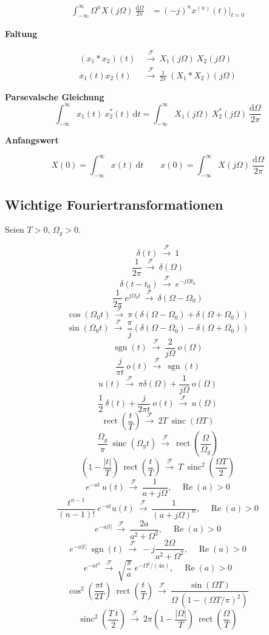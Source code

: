 \documentclass[10pt,a4paper]{article}
\newcommand{\fancyformula}[2]{
	\small
	\raggedright\sffamily\textbf{#1}
	#2
}
\newcommand{\ftransform}{
	~\xrightarrow{~\mathcal{F}~}~
}
\DeclareMathOperator{\sinc}{sinc}
\DeclareMathOperator{\sgn}{sgn}
\DeclareMathOperator{\rect}{rect}
\renewcommand{\Re}{\operatorname{Re}}
\begin{document}
\begin{multicols}{2}
{\begin{align*}
	\int_{-\infty}^{\infty}\Omega^n X(j\Omega) ~ \frac{\mathrm d\Omega}{2\pi}&=(-j)^n x^{(n)}(t) \bigg|_{t=0}
\end{align*}	
}
\fancyformula{Faltung}{
\begin{align*}
	(x_1 \ast x_2)(t) &\ftransform X_1(j\Omega) ~ X_2(j\Omega)\\
	x_1(t)x_2(t) &\ftransform \frac{1}{2\pi} ~ (X_1 \ast X_2)(j\Omega)
\end{align*}
}
\fancyformula{Parsevalsche Gleichung}{\[ \int_{-\infty}^{\infty} x_1(t) ~ x_2^*(t) ~ \mathrm dt = \int_{-\infty}^{\infty}X_1(j\Omega) ~ X_2^*(j\Omega) ~ \frac{\mathrm d\Omega}{2\pi} \]}

\fancyformula{Anfangswert}{
	\[ X(0) = \int_{-\infty}^{\infty} x(t) ~ \mathrm dt \qquad x(0)=\int_{-\infty}^{\infty} X(j\Omega) ~ \frac{\mathrm d\Omega}{2\pi} \]	
}
\end{multicols}
\newpage

\subsection*{Wichtige Fouriertransformationen}
Seien $T>0$, $\Omega_g>0$.
\begin{multicols}{2}
	\small
	\[ \delta(t) \ftransform 1 \]
	\[ \frac{1}{2 \pi} \ftransform \delta(\Omega) \]
	\[ \delta(t - t_0) \ftransform e^{-j\Omega t_0} \]
	\[ \frac{1}{2 \pi} ~ e^{j \Omega_0 t} \ftransform \delta(\Omega - \Omega_0) \]
	\[ \cos(\Omega_0 t) \ftransform \pi \left( \delta(\Omega - \Omega_0) + \delta(\Omega + \Omega_0) \right) \]
	\[ \sin(\Omega_0 t) \ftransform \frac{\pi}{j} \left( \delta(\Omega - \Omega_0) - \delta(\Omega + \Omega_0) \right) \]
	\[ \sgn(t) \ftransform \frac{2}{j \Omega} ~ o(\Omega) \]
	\[ \frac{j}{\pi t} ~ o(t) \ftransform \sgn(t) \]
	\[ u(t) \ftransform \pi \delta(\Omega) + \frac{1}{j \Omega} ~ o(\Omega) \]
	\[ \frac{1}{2} ~ \delta(t) + \frac{j}{2 \pi t} ~ o(t) \ftransform u(\Omega) \]
	\[ \rect \left(\frac{t}{T} \right) \ftransform 2 T ~ \sinc(\Omega T) \]
	\[ \frac{\Omega_g}{\pi} ~ \sinc(\Omega_g t) \ftransform \rect \left( \frac{\Omega}{\Omega_g} \right) \]
	\[ \left(1 - \frac{|t|}{T} \right) ~ \rect \left(\frac{t}{T} \right) \ftransform T ~ \sinc^2 \left( \frac{\Omega T}{2} \right) \]
	\[ e^{-at} ~ u(t) \ftransform \frac{1}{a+j\Omega},\quad \Re(a)>0 \]
	\[ \frac{t^{n-1}}{(n-1)!} ~ e^{-at}u(t) \ftransform \frac{1}{(a+j\Omega)^n},\quad \Re(a)>0 \]
	\[ e^{-a |t|} \ftransform \frac{2a}{a^2+\Omega^2},\quad \Re(a)>0\]
	\[ e^{-a |t|} ~ \sgn(t) \ftransform -j\frac{2\Omega}{a^2+\Omega^2},\quad \Re(a)>0 \]
	\[ e^{-at^2} \ftransform \sqrt{\frac{\pi}{a}}~e^{-\Omega^2/(4a)},\quad \Re(a)>0 \]
	\[ \cos^2\left(\frac{\pi t}{2T}\right)~\rect\left(\frac{t}{T}\right) \ftransform \frac{\sin(\Omega T)}{\Omega ~ (1-(\Omega T/\pi)^2)} \]
	\[ \sinc^2\left(\frac{T~t}{2}\right) \ftransform 2\pi\left(1-\frac{|\Omega|}{T}\right)~\rect\left(\frac{\Omega}{T}\right) \]
\end{multicols}
\end{document}
